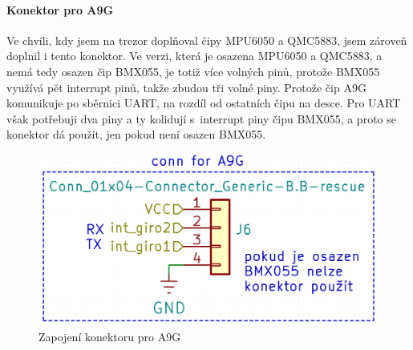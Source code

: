 \newpage

\paragraph{Konektor pro A9G} %
Ve chvíli, kdy jsem na trezor doplňoval čipy MPU6050 a QMC5883, jsem zároveň doplnil i tento konektor. Ve verzi, která je osazena MPU6050 a QMC5883, a nemá tedy osazen čip BMX055, je totiž více
volných pinů, protože BMX055 využívá pět interrupt pinů, takže zbudou tři volné piny. Protože čip A9G komunikuje po sběrnici UART, na rozdíl od ostatních čipu na desce. Pro UART však potřebuji
dva piny a ty kolidují s~interrupt piny čipu BMX055, a proto se konektor dá použít, jen pokud není osazen BMX055.

\begin{figure}[htbp]
    \centering
    \includegraphics[width=\textwidth]{kapitoly/obrazky/E4/vnimani/conn-A9G.png}
    \caption{Zapojení konektoru pro A9G}
    \label{fig:E4-A9G}
\end{figure}

\newpage